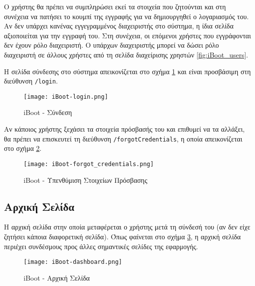 Ο χρήστης θα πρέπει να συμπληρώσει εκεί τα στοιχεία που ζητούνται και στη συνέχεια να πατήσει το κουμπί της εγγραφής για να δημιουργηθεί ο λογαριασμός του. Αν δεν υπάρχει κανένας εγγεγραμμένος διαχειριστής στο σύστημα, η ίδια σελίδα αξιοποιείται για την εγγραφή του. Στη συνέχεια, οι επόμενοι χρήστες που εγγράφονται δεν έχουν ρόλο διαχειριστή. Ο υπάρχων διαχειριστής μπορεί να δώσει ρόλο διαχειριστή σε άλλους χρήστες από τη σελίδα διαχείρισης χρηστών \ref{fig:iBoot_users}.

Η σελίδα σύνδεσης στο σύστημα απεικονίζεται στο σχήμα \ref{fig:iBoot_login} και είναι προσβάσιμη στη διεύθυνση \verb!/login!.
\begin{figure}[ht]
	\centering
	\texttt{[image: iBoot-login.png]}
	\caption{iBoot - Σύνδεση}
	\label{fig:iBoot_login}
\end{figure}

Αν κάποιος χρήστης ξεχάσει τα στοιχεία πρόσβασής του και επιθυμεί να τα αλλάξει, θα πρέπει να επισκευτεί τη διεύθυνση \verb!/forgotCredentials!, η οποία απεικονίζεται στο σχήμα \ref{fig:iBoot_forgot_credentials}.
\begin{figure}[ht]
	\centering
	\texttt{[image: iBoot-forgot\_credentials.png]}
	\caption{iBoot - Υπενθύμιση Στοιχείων Πρόσβασης}
	\label{fig:iBoot_forgot_credentials}
\end{figure}
\FloatBarrier

\subsection{Αρχική Σελίδα}
\FloatBarrier
Η αρχική σελίδα στην οποία μεταφέρεται ο χρήστης μετά τη σύνδεσή του (αν δεν είχε ζητήσει κάποια διαφορετική σελίδα). Όπως φαίνεται στο σχήμα \ref{fig:iBoot_dashboard}, η αρχική σελίδα περιέχει συνδέσμους προς άλλες σημαντικές σελίδες της εφαρμογής.
\begin{figure}[ht]
	\centering
	\texttt{[image: iBoot-dashboard.png]}
	\caption{iBoot - Αρχική Σελίδα}
	\label{fig:iBoot_dashboard}
\end{figure}
\FloatBarrier

